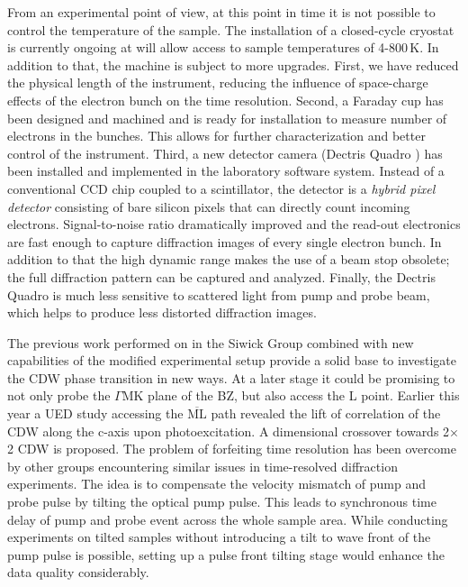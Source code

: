 From an experimental point of view, at this point in time it is not possible to control the temperature of the sample.
The installation of a closed-cycle cryostat is currently ongoing at will allow access to sample temperatures of 4-800\,K.
In addition to that, the machine is subject to more upgrades.
First, we have reduced the physical length of the instrument, reducing the influence of space-charge effects of the electron bunch on the time resolution.
Second, a Faraday cup has been designed and machined and is ready for installation to measure number of electrons in the bunches.
This allows for further characterization and better control of the instrument.
Third, a new detector camera (Dectris Quadro \cite{dectris2022}) has been installed and implemented in the laboratory software system.
Instead of a conventional CCD chip coupled to a scintillator, the detector is a \emph{hybrid pixel detector} consisting of bare silicon pixels that can directly count incoming electrons.
Signal-to-noise ratio dramatically improved and the read-out electronics are fast enough to capture diffraction images of every single electron bunch.
In addition to that the high dynamic range makes the use of a beam stop obsolete; the full diffraction pattern can be captured and analyzed.
Finally, the Dectris Quadro is much less sensitive to scattered light from pump and probe beam, which helps to produce less distorted diffraction images.

The previous work performed on \ts\space in the Siwick Group combined with new capabilities of the modified experimental setup provide a solid base to investigate the \ac{CDW} phase transition in new ways.
At a later stage it could be promising to not only probe the $\Gamma\mathrm{MK}$ plane of the \ac{BZ}, but also access the L point.
Earlier this year a \ac{UED} study accessing the $\overline{\mathrm{ML}}$ path revealed the lift of correlation of the \ac{CDW} along the c-axis upon photoexcitation.
A dimensional crossover towards 2$\times$2 \ac{CDW} is proposed\cite{cheng2022}.
The problem of forfeiting time resolution has been overcome by other groups encountering similar issues in time-resolved diffraction experiments.
The idea is to compensate the velocity mismatch of pump and probe pulse by tilting the optical pump pulse.
This leads to synchronous time delay of pump and probe event across the whole sample area\cite{baum2006,zhou2013}.
While conducting experiments on tilted samples without introducing a tilt to wave front of the pump pulse is possible, setting up a pulse front tilting stage would enhance the data quality considerably.

